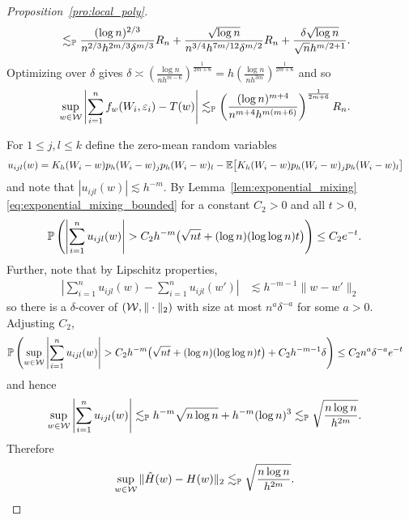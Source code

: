\begin{proof}[Proposition~\ref{pro:local_poly}]
\begin{align*}
    &\lesssim_\P
    \frac{(\log n)^{2/3}}{n^{2/3} h^{2m/3} \delta^{m/3}} R_n
    + \frac{\sqrt{\log n}}{n^{3/4} h^{7m/12} \delta^{m/2}} R_n
    + \frac{\delta \sqrt{\log n}} {\sqrt{n} h^{m/2+1}}.
  \end{align*}
  Optimizing over $\delta$ gives
  $\delta \asymp \left(\frac{\log n}{n h^{m-6}}\right)^{\frac{1}{2m+6}}
  = h \left( \frac{\log n}{n h^{3m}} \right)^{\frac{1}{2m+6}}$
  and so
  \begin{align*}
    \sup_{w \in \cW}
    \left| \sum_{i=1}^n f_{w}(W_i, \varepsilon_i)
    - T(w) \right|
    &\lesssim_\P
    \left(
      \frac{(\log n)^{m+4}}{n^{m+4}h^{m(m+6)}}
    \right)^{\frac{1}{2m+6}} R_n.
  \end{align*}


  For $1 \leq j,l \leq k$
  define the zero-mean random variables
  \begin{align*}
    u_{i j l}(w)
    &=
    K_h(W_i-w) p_h(W_i-w)_j p_h(W_i-w)_l
    - \E\big[K_h(W_i-w) p_h(W_i-w)_j p_h(W_i-w)_l \big]
  \end{align*}
  and note that
  $|u_{i j l}(w)| \lesssim h^{-m}$.
  By Lemma~\ref{lem:exponential_mixing}\ref{eq:exponential_mixing_bounded}
  for a constant $C_2 > 0$ and all $t > 0$,
  \begin{align*}
    \P\left(
      \left|
      \sum_{i=1}^n
      u_{i j l}(w)
      \right|
      > C_2 h^{-m} \big( \sqrt{n t}
      + (\log n)(\log \log n) t \big)
    \right)
    &\leq
    C_2 e^{-t}.
  \end{align*}
  Further, note that by Lipschitz properties,
  \begin{align*}
    \left|
    \sum_{i=1}^n u_{i j l}(w)
    - \sum_{i=1}^n  u_{i j l}(w')
    \right|
    &\lesssim
    h^{-m-1} \|w-w'\|_2
  \end{align*}
  so there is a $\delta$-cover of $(\cW, \|\cdot\|_2)$
  with size at most $n^a \delta^{-a}$ for some $a > 0$.
  Adjusting $C_2$,
  \begin{align*}
    \P\left(
      \sup_{w \in \cW}
      \left|
      \sum_{i=1}^n
      u_{i j l}(w)
      \right|
      > C_2 h^{-m} \big( \sqrt{n t}
      + (\log n)(\log \log n) t \big)
      + C_2 h^{-m-1} \delta
    \right)
    &\leq
    C_2 n^a \delta^{-a}
    e^{-t}
  \end{align*}
  and hence
  \begin{align*}
    \sup_{w \in \cW}
    \left|
    \sum_{i=1}^n
    u_{i j l}(w)
    \right|
    &\lesssim_\P
    h^{-m} \sqrt{n \log n}
    + h^{-m} (\log n)^3
    \lesssim_\P
    \sqrt{\frac{n \log n}{h^{2m}}}.
  \end{align*}
  Therefore
  \begin{align*}
    \sup_{w\in\cW} \|\hat H(w)-H(w)\|_2
    &\lesssim_\P
    \sqrt{\frac{n \log n}{h^{2m}}}.
  \end{align*}


\end{proof}
